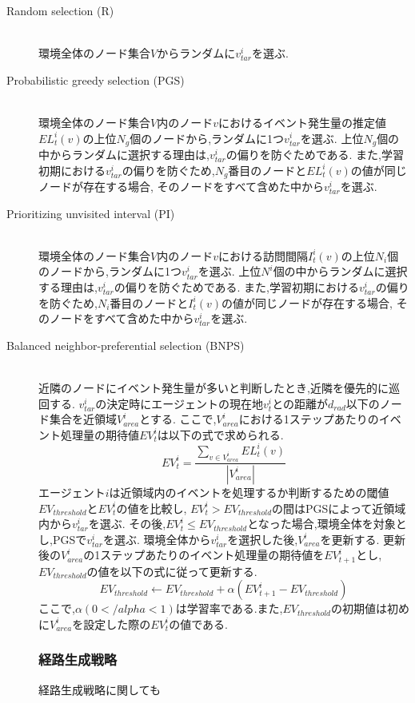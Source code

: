 \documentclass[12pt,a4j,twoside]{jarticle}
\begin{document}
\begin{description}
  \item[Random selection (R)]\mbox{}\\
  環境全体のノード集合$V$からランダムに$v^i_{tar}$を選ぶ.

  \item[Probabilistic greedy selection (PGS)]\mbox{} \\
  環境全体のノード集合$V$内のノード$v$におけるイベント発生量の推定値$EL^i_t(v)$の上位$N_g$個のノードから,ランダムに1つ$v^i_{tar}$を選ぶ.
  上位$N_g$個の中からランダムに選択する理由は,$v^i_{tar}$の偏りを防ぐためである.
  また,学習初期における$v^i_{tar}$の偏りを防ぐため,$N_g$番目のノードと$EL^i_t(v)$の値が同じノードが存在する場合,
  そのノードをすべて含めた中から$v^i_{tar}$を選ぶ.
  \item[Prioritizing unvisited interval (PI)]\mbox{} \\
  環境全体のノード集合$V$内のノード$v$における訪問間隔$I^i_t(v)$の上位$N_i$個のノードから,ランダムに1つ$v^i_{tar}$を選ぶ.
  上位$N^i$個の中からランダムに選択する理由は,$v^i_{tar}$の偏りを防ぐためである.
  また,学習初期における$v^i_{tar}$の偏りを防ぐため,$N_i$番目のノードと$I^i_t(v)$の値が同じノードが存在する場合,
  そのノードをすべて含めた中から$v^i_{tar}$を選ぶ.

  \item[Balanced neighbor-preferential selection (BNPS)]\mbox{} \\
  近隣のノードにイベント発生量が多いと判断したとき,近隣を優先的に巡回する.
  $v^i_{tar}$の決定時にエージェントの現在地$v^i_t$との距離が$d_{rad}$以下のノード集合を近領域$V^i_{area}$とする.
  ここで,$V^i_{area}$における1ステップあたりのイベント処理量の期待値$EV^i_t$は以下の式で求められる.
  \[
  EV^i_t = \frac{\displaystyle \sum_{v \in V^i_{area}}EL^i_t(v)}{|V^i_{area}|}  
  \] 
  エージェント$i$は近領域内のイベントを処理するか判断するための閾値$EV_{threshold}$と$EV^i_t$の値を比較し,
  $EV^i_t > EV_{threshold}$の間はPGSによって近領域内から$v^i_{tar}$を選ぶ.
  その後,$EV^i_t \le EV_{threshold}$となった場合,環境全体を対象とし,PGSで$v^i_{tar}$を選ぶ.
  環境全体から$v^i_{tar}$を選択した後,$V^i_{area}$を更新する.
  更新後の$V^i_{area}$の1ステップあたりのイベント処理量の期待値を$EV^i_{t+1}$とし,$EV_{threshold}$の値を以下の式に従って更新する.
  \[
  EV_{threshold} \gets EV_{threshold} + \alpha(EV^i_{t+1} - EV_{threshold})
  \]
  ここで,$\alpha(0</alpha<1)$は学習率である.また,$EV_{threshold}$の初期値は初めに$V^i_{area}$を設定した際の$EV^i_t$の値である.

  \subsubsection{経路生成戦略}
  経路生成戦略に関しても
        
\end{description}
\end{document}
